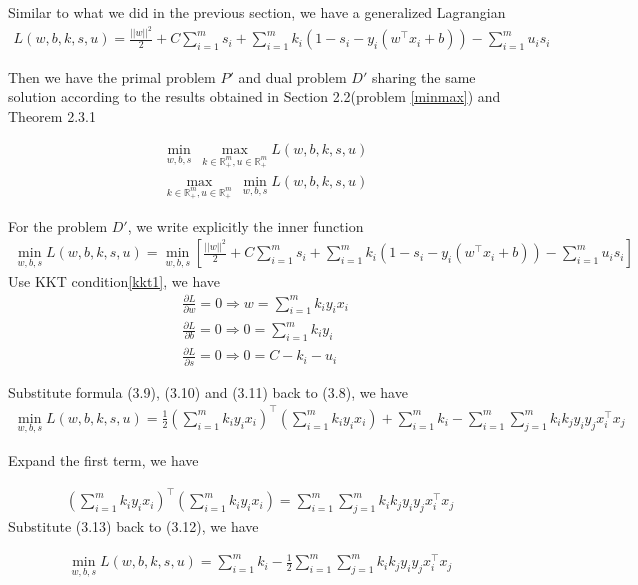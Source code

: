 \documentclass[a4paper]{report}
\begin{document}
Similar to what we did in the previous section, we have a generalized Lagrangian
\begin{align}
    L(w,b,k,s,u) = \frac{||w||^2}{2}+C\sum_{i=1}^m s_i + \sum_{i=1}^m k_i(1-s_i-y_i(w^\top x_i + b)) - \sum_{i=1}^m u_i s_i
\end{align}

Then we have the primal problem $P'$ and dual problem $D'$ sharing the same solution according to the results obtained in Section 2.2(problem \ref{minmax}) and Theorem 2.3.1

\begin{align}
    &\min_{w,b,s} \ \max_{k\in\mathbb R_+^m,u\in\mathbb R_+^m} L(w,b,k,s,u) \tag{P'}\\
    &\max_{k\in\mathbb R_+^m,u\in\mathbb R_+^m} \ \min_{w,b,s} L(w,b,k,s,u) \tag{D'}
\end{align}

For the problem $D'$, we write explicitly the inner function
\begin{align}
    \min_{w,b,s} L(w,b,k,s,u)=\min_{w,b,s}[\frac{||w||^2}{2}+C\sum_{i=1}^m s_i + \sum_{i=1}^m k_i(1-s_i-y_i(w^\top x_i + b)) - \sum_{i=1}^m u_i s_i]
\end{align}
Use KKT condition\ref{kkt1}, we have
\begin{align}
    &\frac{\partial L}{\partial w}=0\Rightarrow w=\sum_{i=1}^m k_i y_i x_i\\
    &\frac{\partial L}{\partial b}=0\Rightarrow 0=\sum_{i=1}^m k_i y_i \\
    &\frac{\partial L}{\partial s}=0\Rightarrow 0=C-k_i-u_i
\end{align}

Substitute formula (3.9), (3.10) and (3.11) back to (3.8), we have 
\begin{align}
    \min_{w,b,s} L(w,b,k,s,u) = \frac{1}{2}\left( \sum_{i=1}^m k_i y_i x_i \right)^\top \left( \sum_{i=1}^m k_i y_i x_i\right) + \sum_{i=1}^m k_i - \sum_{i=1}^m\sum_{j=1}^m k_i k_j y_i y_j x_i^\top x_j
\end{align}

Expand the first term, we have 

\begin{align}
    \left( \sum_{i=1}^m k_i y_i x_i \right)^\top \left( \sum_{i=1}^m k_i y_i x_i\right)= \sum_{i=1}^m\sum_{j=1}^m k_i k_j y_i y_j x_i^\top x_j
\end{align}
Substitute (3.13) back to (3.12), we have

\begin{align}
    \min_{w,b,s} L(w,b,k,s,u) = \sum_{i=1}^m k_i - \frac{1}{2} \sum_{i=1}^m\sum_{j=1}^m k_i k_j y_i y_j x_i^\top x_j
\end{align}
\end{document}
